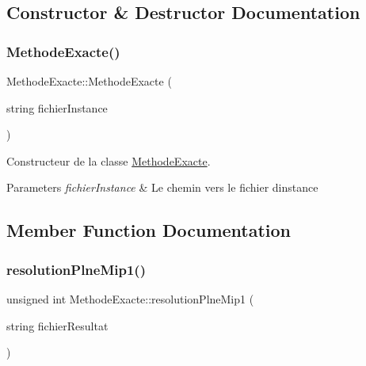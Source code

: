 \subsection{Constructor \& Destructor Documentation}
\mbox{\label{classMethodeExacte_a1548457daee37a44a3913378d90dab65}} 
\subsubsection{\texorpdfstring{Methode\+Exacte()}{MethodeExacte()}}
{\footnotesize\ttfamily Methode\+Exacte\+::\+Methode\+Exacte (\begin{DoxyParamCaption}\item[{string}]{fichier\+Instance }\end{DoxyParamCaption})}



Constructeur de la classe \hyperlink{classMethodeExacte}{Methode\+Exacte}. 


\begin{DoxyParams}{Parameters}
{\em fichier\+Instance} & Le chemin vers le fichier d\textquotesingle{}instance \\
\hline
\end{DoxyParams}


\subsection{Member Function Documentation}
\mbox{\label{classMethodeExacte_a91443b3ea749912772b40b5b5c40379e}} 
\subsubsection{\texorpdfstring{resolution\+Plne\+Mip1()}{resolutionPlneMip1()}}
{\footnotesize\ttfamily unsigned int Methode\+Exacte\+::resolution\+Plne\+Mip1 (\begin{DoxyParamCaption}\item[{string}]{fichier\+Resultat }\end{DoxyParamCaption})}



